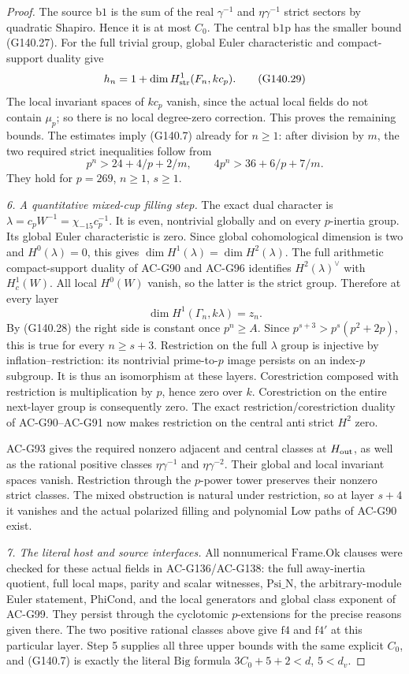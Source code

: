 \begin{proof}
The source $\mathrm{b1}$ is the sum of the real
$\gamma^{-1}$ and $\eta\gamma^{-1}$ strict sectors by
quadratic Shapiro.  Hence it is at most $C_0$.
The central $\mathrm{b1p}$ has the smaller bound (G140.27).
For the full trivial group, global Euler characteristic and
compact-support duality give
\[
 h_n=1+\dim H^1_{\rm str}(F_n,kc_p).
 \tag{G140.29}
\]
The local invariant spaces of $kc_p$ vanish, since the actual
local fields do not contain $\mu_p$; so there is no local
degree-zero correction.  This proves the remaining bounds.
The estimates imply (G140.7) already for $n\ge1$: after division
by $m$, the two required strict inequalities follow from
\[
 p^n>24+4/p+2/m,
 \qquad 4p^n>36+6/p+7/m.
 \tag{G140.30}
\]
They hold for $p=269$, $n\ge1$, $s\ge1$.

\emph{6. A quantitative mixed-cup filling step.}
The exact dual character is
$\lambda=c_pW^{-1}=\chi_{-15}c_p^{-1}$.
It is even, nontrivial globally and on every $p$-inertia group.
Its global Euler characteristic is zero.  Since global
cohomological dimension is two and $H^0(\lambda)=0$, this gives
$\dim H^1(\lambda)=\dim H^2(\lambda)$.
The full arithmetic compact-support duality of AC-G90 and
AC-G96 identifies $H^2(\lambda)^\vee$ with $H^1_c(W)$.
All local $H^0(W)$ vanish, so the latter is the strict group.
Therefore at every layer
\[
                  \dim H^1(\Gamma_n,k\lambda)=z_n.
 \tag{G140.31}
\]
By (G140.28) the right side is constant once $p^n\ge A$.
Since $p^{s+3}>p^s(p^2+2p)$, this is true for every
$n\ge s+3$.  Restriction on the full $\lambda$ group is
injective by inflation--restriction: its nontrivial prime-to-$p$
image persists on an index-$p$ subgroup.  It is thus an
isomorphism at these layers.  Corestriction composed with
restriction is multiplication by $p$, hence zero over $k$.
Corestriction on the entire next-layer group is consequently zero.
The exact restriction/corestriction duality of AC-G90--AC-G91
now makes restriction on the central anti strict $H^2$ zero.

AC-G93 gives the required nonzero adjacent and central classes
at $H_{\rm out}$, as well as the rational positive classes
$\eta\gamma^{-1}$ and $\eta\gamma^{-2}$.
Their global and local invariant spaces vanish.  Restriction
through the $p$-power tower preserves their nonzero strict
classes.  The mixed obstruction is natural under restriction,
so at layer $s+4$ it vanishes and the actual polarized filling
and polynomial Low paths of AC-G90 exist.

\emph{7. The literal host and source interfaces.}
All nonnumerical $\mathrm{Frame.Ok}$ clauses were checked for
these actual fields in AC-G136/AC-G138: the full away-inertia
quotient, full local maps, parity and scalar witnesses,
$\mathrm{Psi\_N}$, the arbitrary-module Euler statement,
$\mathrm{PhiCond}$, and the local generators and global class
exponent of AC-G99.  They persist through the cyclotomic
$p$-extensions for the precise reasons given there.
The two positive rational classes above give $\mathrm{f4}$
and $\mathrm{f4'}$ at this particular layer.  Step 5 supplies
all three upper bounds with the same explicit $C_0$, and
(G140.7) is exactly the literal $\mathrm{Big}$ formula
$3C_0+5+2<d$, $5<d_v$.


\end{proof}
